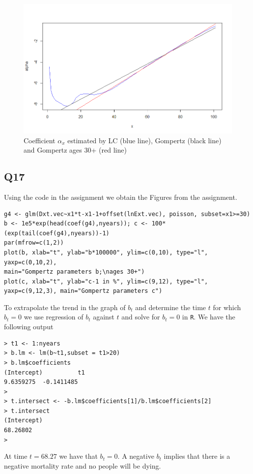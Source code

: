 \documentclass[11pt]{article}
\begin{document}
\begin{center}
	\begin{figure}[H]
		
		\includegraphics[scale=0.75]{NL3_Question16.png}
		
		\caption{Coefficient $\alpha_x$ estimated by LC (blue line),  Gompertz (black line) and Gompertz ages 30+ (red line) }
		\label{Figure_Question15}
		
	\end{figure}
\end{center}


\subsection*{Q17}
Using the code in the assignment we obtain the Figures from the assignment.

\begin{verbatim}
g4 <- glm(Dxt.vec~x1*t-x1-1+offset(lnExt.vec), poisson, subset=x1>=30)
b <- 1e5*exp(head(coef(g4),nyears)); c <- 100*(exp(tail(coef(g4),nyears))-1)
par(mfrow=c(1,2))
plot(b, xlab="t", ylab="b*100000", ylim=c(0,10), type="l", yaxp=c(0,10,2),
main="Gompertz parameters b;\nages 30+")
plot(c, xlab="t", ylab="c-1 in %", ylim=c(9,12), type="l",
yaxp=c(9,12,3), main="Gompertz parameters c")
\end{verbatim}

To extrapolate the trend in the graph of $b_t$ and determine the time $t$ for which $b_t = 0$ we use regression of $b_t$ against $t$ and solve for $b_t = 0$ in \verb|R|. We have the following output
\begin{verbatim}
> t1 <- 1:nyears
> b.lm <- lm(b~t1,subset = t1>20)
> b.lm$coefficients
(Intercept)          t1 
9.6359275  -0.1411485 
> 
> t.intersect <- -b.lm$coefficients[1]/b.lm$coefficients[2]
> t.intersect
(Intercept) 
68.26802 
>
\end{verbatim}
At time $t=68.27$ we have that $b_t = 0$. A negative $b_t$ implies that there is a negative mortality rate and no people will be dying.
\end{document}
